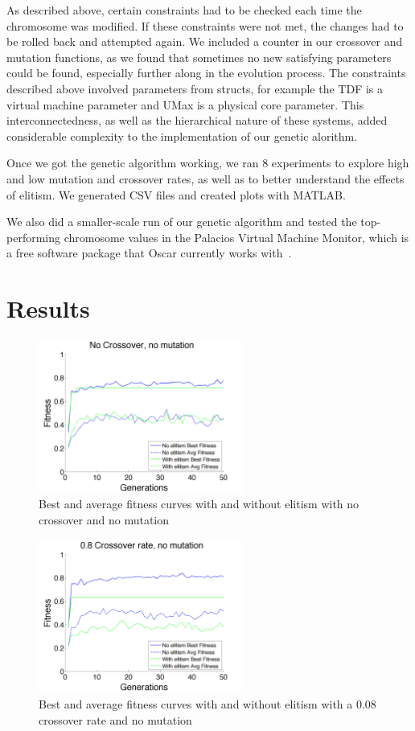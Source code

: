 \documentclass[11pt]{article}
\begin{document}
As described above, certain constraints had to be checked each time the chromosome was modified. If these constraints were not met, the changes had to be rolled back and attempted again. We included a counter in our crossover and mutation functions, as we found that sometimes no new satisfying parameters could be found, especially further along in the evolution process. The constraints described above involved parameters from structs, for example the TDF is a virtual machine parameter and UMax is a physical core parameter. This interconnectedness, as well as the hierarchical nature of these systems, added considerable complexity to the implementation of our genetic alorithm. 

Once we got the genetic algorithm working, we ran 8 experiments to explore high and low mutation and crossover rates, as well as to better understand the effects of elitism. We generated CSV files and created plots with MATLAB. 

We also did a smaller-scale run of our genetic algorithm and tested the top-performing chromosome values in the Palacios Virtual Machine Monitor, which is a free software package that Oscar currently works with~\cite{Mondragon:13}. 

\section{Results}
\begin{figure}[H]
 \centering
  \includegraphics[width=0.6\textwidth,height=0.2\textheight]{figures/fitness0mut0cross.png}
  \caption{Best and average fitness curves with and without elitism with no crossover and no mutation}
  \label{fig:fig1}  
\end{figure}

\begin{figure}[H]
 \centering
  \includegraphics[width=0.6\textwidth,height=0.2\textheight]{figures/fitness0mut08cross.png}
  \caption{Best and average fitness curves with and without elitism with a 0.08 crossover rate and no mutation}
  \label{fig:fig2}  
\end{figure}
\end{document}
